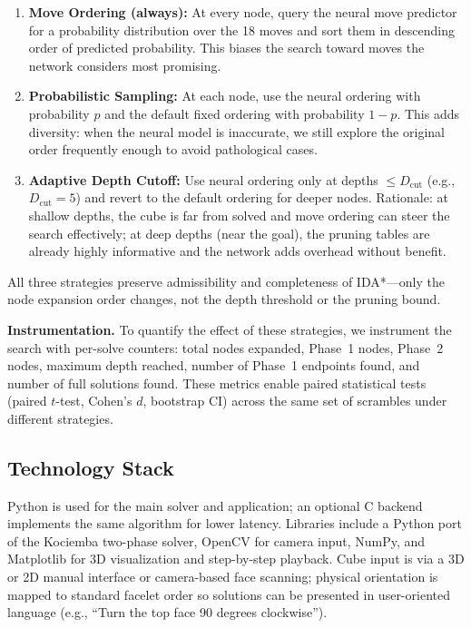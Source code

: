 \documentclass[10pt,twocolumn,a4paper]{article}
\begin{document}
\begin{enumerate}
  \item[\textbf{(A)}] \textbf{Move Ordering (always):} At every node, query the neural move predictor for a probability distribution over the 18 moves and sort them in descending order of predicted probability. This biases the search toward moves the network considers most promising.
  \item[\textbf{(B)}] \textbf{Probabilistic Sampling:} At each node, use the neural ordering with probability $p$ and the default fixed ordering with probability $1-p$. This adds diversity: when the neural model is inaccurate, we still explore the original order frequently enough to avoid pathological cases.
  \item[\textbf{(C)}] \textbf{Adaptive Depth Cutoff:} Use neural ordering only at depths $\leq D_{\mathrm{cut}}$ (e.g., $D_{\mathrm{cut}} = 5$) and revert to the default ordering for deeper nodes. Rationale: at shallow depths, the cube is far from solved and move ordering can steer the search effectively; at deep depths (near the goal), the pruning tables are already highly informative and the network adds overhead without benefit.
\end{enumerate}

All three strategies preserve admissibility and completeness of IDA*---only the node expansion order changes, not the depth threshold or the pruning bound.

\textbf{Instrumentation.} To quantify the effect of these strategies, we instrument the search with per-solve counters: total nodes expanded, Phase~1 nodes, Phase~2 nodes, maximum depth reached, number of Phase~1 endpoints found, and number of full solutions found. These metrics enable paired statistical tests (paired $t$-test, Cohen's $d$, bootstrap CI) across the same set of scrambles under different strategies.

\subsection{Technology Stack}
Python is used for the main solver and application; an optional C backend implements the same algorithm for lower latency. Libraries include a Python port of the Kociemba two-phase solver, OpenCV for camera input, NumPy, and Matplotlib for 3D visualization and step-by-step playback. Cube input is via a 3D or 2D manual interface or camera-based face scanning; physical orientation is mapped to standard facelet order so solutions can be presented in user-oriented language (e.g., ``Turn the top face 90 degrees clockwise'').
\end{document}
